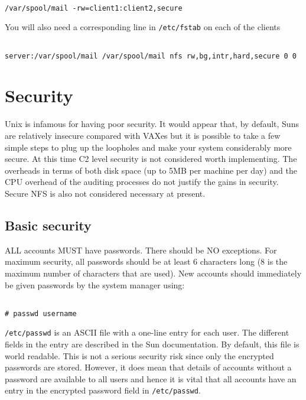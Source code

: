 \begin{verbatim}

/var/spool/mail -rw=client1:client2,secure

\end{verbatim}

You will also need a corresponding line in {\tt /etc/fstab} on each of the
clients

\begin{verbatim}

server:/var/spool/mail /var/spool/mail nfs rw,bg,intr,hard,secure 0 0

\end{verbatim}

\section{Security}

Unix is infamous for having poor security. It would appear that, by
default, Suns are relatively insecure compared with VAXes but it is possible to
take a few simple steps to plug up the loopholes and make your system
considerably more secure. At this time C2 level security is not considered
worth implementing. The overheads in terms of both disk space (up to 5MB per
machine per day) and the CPU overhead of the auditing processes do not justify
the gains in security. Secure NFS is also not considered necessary at present.

\subsection{Basic security}

ALL accounts MUST have passwords. There should be NO exceptions.
For maximum security, all passwords should be at least 6 characters long
(8 is the maximum number of characters that are used).
New accounts should immediately be given passwords by the system
manager using:

\begin{verbatim}

# passwd username

\end{verbatim}

{\tt /etc/passwd} is an ASCII file with a one-line entry for
each user. The different fields in the entry are described in the
Sun documentation. By default, this file is world readable. This is not
a serious security risk since only the encrypted passwords are stored. However,
it does mean that details of accounts without a password are available to all
users and hence it is vital that all accounts have an entry in the encrypted
password field in {\tt /etc/passwd}.

